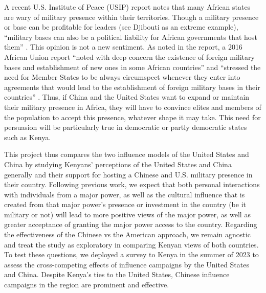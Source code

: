 

A recent U.S. Institute of Peace (USIP) report notes that many African states are wary of military presence within their territories. Though a military presence or base can be profitable for leaders (see Djibouti as an extreme example), ``military bases can also be a political liability for African governments that host them'' \cite{usip2024}. This opinion is not a new sentiment. As noted in the report, a 2016 African Union report ``noted with deep concern the existence of foreign military bases and establishment of new ones in some African countries'' and ``stressed the need for Member States to be always circumspect whenever they enter into agreements that would lead to the establishment of foreign military bases in their countries'' \cite{AU2016}. Thus, if China and the United States want to expand or maintain their military presence in Africa, they will have to convince elites and members of the population to accept this presence, whatever shape it may take. This need for persuasion will be particularly true in democratic or partly democratic states such as Kenya. 

This project thus compares the two influence models of the United States and China by studying Kenyans' perceptions of the United States and China generally and their support for hosting a Chinese and U.S. military presence in their country. Following previous work, we expect that both personal interactions with individuals from a major power, as well as the cultural influence that is created from that major power's presence or investment in the country (be it military or not) will lead to more positive views of the major power, as well as greater acceptance of granting the major power access to the country. Regarding the effectiveness of the Chinese vs the American approach, we remain agnostic and treat the study as exploratory in comparing Kenyan views of both countries. To test these questions, we deployed a survey to Kenya in the summer of 2023 to assess the cross-competing effects of influence campaigns by the United States and China. Despite Kenya's ties to the United States, Chinese influence campaigns in the region are prominent and effective. 






